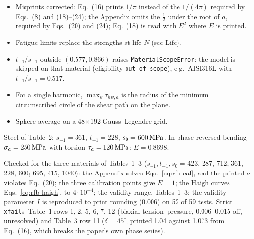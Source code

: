 \begin{itemize}
\item Misprints corrected: Eq.~(16) prints $1/\pi$ instead of the $1/(4\pi)$ required by Eqs.~(8) and
  (18)--(24); the Appendix omits the $\tfrac12$ under the root of $a$, required by Eqs.~(20) and (24);
  Eq.~(18) is read with $E^2$ where $E$ is printed.
\item Fatigue limits replace the strengths at life $N$ (see Life).
\item $t_{-1}/s_{-1}$ outside $(0.577,0.866)$ raises \texttt{MaterialScopeError}: the model is skipped
  on that material (eligibility \texttt{out\_of\_scope}), e.g.\ AISI316L with $t_{-1}/s_{-1}=0.517$.
\item For a single harmonic, $\max_\psi\tau_{h\psi,a}$ is the radius of the minimum circumscribed
  circle of the shear path on the plane.
\item Sphere average on a 48$\times$192 Gauss--Legendre grid.
\end{itemize}

 Steel of Table~2: $s_{-1}=361$, $t_{-1}=228$, $s_0=600\,\mathrm{MPa}$. In-phase reversed
bending $\sigma_a=250\,\mathrm{MPa}$ with torsion $\tau_a=120\,\mathrm{MPa}$: $E=0.8698$.

 Checked for the three materials of Tables~1--3
($s_{-1},t_{-1},s_0$ = 423, 287, 712; 361, 228, 600; 695, 415, 1040\MPa): the Appendix solves
Eqs.~\eqref{eq:rfb-cal}, and the printed $a$ violates Eq.~(20); the three calibration points give
$E=1$; the Haigh curves Eqs.~\eqref{eq:rfb-haigh}, to $4\cdot10^{-4}$; the validity range. Tables~1--3:
the validity parameter $I$ is reproduced to print rounding (0.006) on 52 of 59 tests. Strict
\texttt{xfail}s: Table~1 rows 1, 2, 5, 6, 7, 12 (biaxial tension--pressure, 0.006--0.015 off,
unresolved) and Table~3 row 11 ($\delta=45^\circ$, printed 1.04 against 1.073 from Eq.~(16), which
breaks the paper's own phase series).

